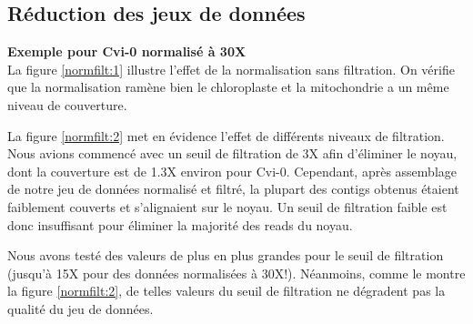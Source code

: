 \documentclass[a4paper]{article}
\begin{document}
\subsection{Réduction des jeux de données}
\hspace{1cm}\textbf{Exemple pour Cvi-0 normalisé à 30X}\\

La figure \ref{normfilt:1} illustre l'effet de la normalisation sans filtration. On vérifie que la normalisation ramène bien le chloroplaste et la mitochondrie a un même niveau de couverture. 

La figure \ref{normfilt:2} met en évidence l'effet de différents niveaux de filtration. Nous avions commencé avec un seuil de filtration de 3X afin d'éliminer le noyau, dont la couverture est de 1.3X environ pour Cvi-0. Cependant, après assemblage de notre jeu de données normalisé et filtré, la plupart des contigs obtenus étaient faiblement couverts et s'alignaient sur le noyau. Un seuil de filtration faible est donc insuffisant pour éliminer la majorité des reads du noyau. 

Nous avons testé des valeurs de plus en plus grandes pour le seuil de filtration (jusqu'à 15X pour des données normalisées à 30X!). Néanmoins, comme le montre la figure \ref{normfilt:2}, de telles valeurs du seuil de filtration ne dégradent pas la qualité du jeu de données. 
\end{document}
